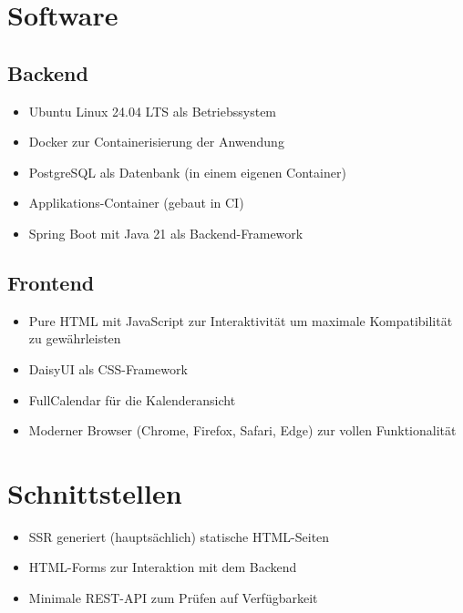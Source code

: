 \section{Software}

\subsection{Backend}

\begin{itemize}
    \item Ubuntu Linux 24.04 LTS als Betriebssystem
    \item Docker zur Containerisierung der Anwendung
    \item PostgreSQL als Datenbank (in einem eigenen Container)
    \item Applikations-Container (gebaut in CI)
    \item Spring Boot mit Java 21 als Backend-Framework
\end{itemize}

\subsection{Frontend}

\begin{itemize}
    \item Pure HTML mit JavaScript zur Interaktivität um maximale Kompatibilität zu gewährleisten
    \item DaisyUI als CSS-Framework
    \item FullCalendar für die Kalenderansicht
    \item Moderner Browser (Chrome, Firefox, Safari, Edge) zur vollen Funktionalität
\end{itemize}

\section{Schnittstellen}

\begin{itemize}
    \item SSR generiert (hauptsächlich) statische HTML-Seiten
    \item HTML-Forms zur Interaktion mit dem Backend
    \item Minimale REST-API zum Prüfen auf Verfügbarkeit
\end{itemize}